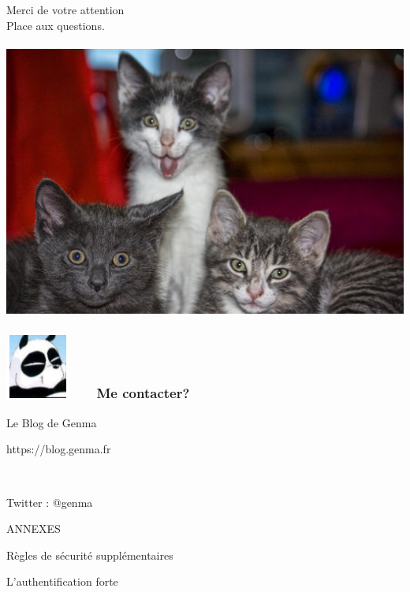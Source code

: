 \documentclass{beamer}
\begin{document}
\begin{frame}
\begin{center}
\Huge{Merci de votre attention}
\\
\Huge{Place aux questions.}
\\~\\
\includegraphics[scale=0.2] {./images/chat.jpg}
\end{center}
\end{frame}


\begin{frame}
\frametitle{\includegraphics[scale=0.4]{./images/Genma.jpg} \ \ \  Me contacter?}
\Huge{\centerline{Le Blog de Genma}}
\Huge{\centerline{https://blog.genma.fr}}
\Huge{\centerline{~}}
\Huge{\centerline{Twitter : @genma}}
\end{frame}


\begin{frame}
\begin{center}
\Huge{ANNEXES}
\end{center}
\end{frame}

\begin{frame}
\begin{center}
\Huge{Règles de sécurité supplémentaires}
\end{center}
\end{frame}
\begin{frame}
\Huge{\centerline{L'authentification forte}}
\end{frame}
\end{document}
